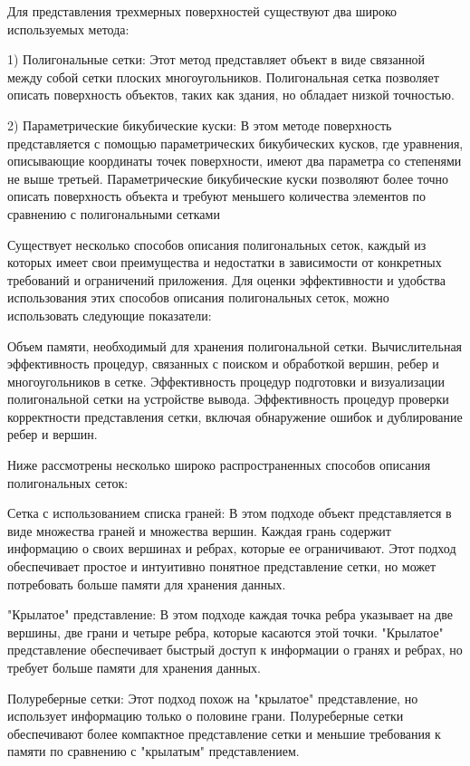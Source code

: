 Для представления трехмерных поверхностей существуют два широко используемых метода:

    1) Полигональные сетки: Этот метод представляет объект в виде связанной между собой сетки плоских многоугольников. Полигональная сетка позволяет описать поверхность объектов, таких как здания, но обладает низкой точностью.

    2) Параметрические бикубические куски: В этом методе поверхность представляется с помощью параметрических бикубических кусков, где уравнения, описывающие координаты точек поверхности, имеют два параметра со степенями не выше третьей. Параметрические бикубические куски позволяют более точно описать поверхность объекта и требуют меньшего количества элементов по сравнению с полигональными сетками

Существует несколько способов описания полигональных сеток, каждый из которых имеет свои преимущества и недостатки в зависимости от конкретных требований и ограничений приложения. Для оценки эффективности и удобства использования этих способов описания полигональных сеток, можно использовать следующие показатели:

    Объем памяти, необходимый для хранения полигональной сетки.
    Вычислительная эффективность процедур, связанных с поиском и обработкой вершин, ребер и многоугольников в сетке.
    Эффективность процедур подготовки и визуализации полигональной сетки на устройстве вывода.
    Эффективность процедур проверки корректности представления сетки, включая обнаружение ошибок и дублирование ребер и вершин.

Ниже рассмотрены несколько широко распространенных способов описания полигональных сеток:

    Сетка с использованием списка граней: В этом подходе объект представляется в виде множества граней и множества вершин. Каждая грань содержит информацию о своих вершинах и ребрах, которые ее ограничивают. Этот подход обеспечивает простое и интуитивно понятное представление сетки, но может потребовать больше памяти для хранения данных.

    "Крылатое" представление: В этом подходе каждая точка ребра указывает на две вершины, две грани и четыре ребра, которые касаются этой точки. "Крылатое" представление обеспечивает быстрый доступ к информации о гранях и ребрах, но требует больше памяти для хранения данных.

    Полуреберные сетки: Этот подход похож на "крылатое" представление, но использует информацию только о половине грани. Полуреберные сетки обеспечивают более компактное представление сетки и меньшие требования к памяти по сравнению с "крылатым" представлением.


